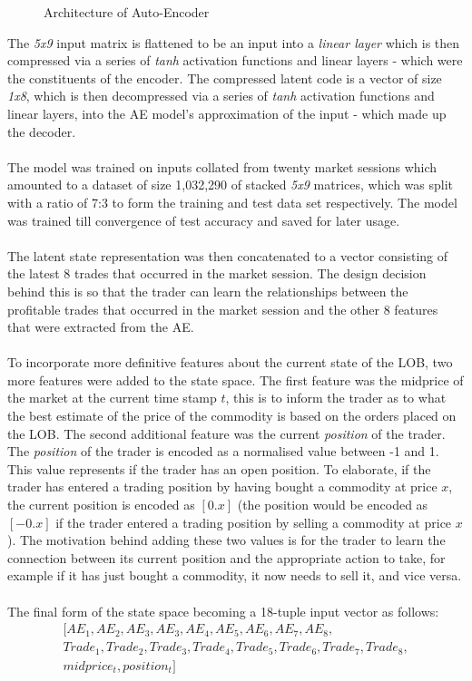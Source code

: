 \documentclass[ %
                    author={Ashwinder Khurana},
                supervisor={Prof Dave Cliff},
                    degree={MEng},
                     title={The Deeply Reinforced Trader},
                  subtitle={},
                      type={enterprise},
                      year={2020} ]{dissertation}
\begin{document}
{\begin{figure}[H]
{  \caption{Architecture of Auto-Encoder}
  }
\label{fig:AE-arch}  
\end{figure}
\noindent 
The \textit{5x9} input matrix is flattened to be an input into a \textit{linear layer} which is then compressed via a series of \textit{tanh} activation functions and linear layers - which were the constituents of the encoder. The compressed latent code is a vector of size \textit{1x8}, which is then decompressed via a series of \textit{tanh} activation functions and linear layers, into the AE model's approximation of the input - which made up the decoder. 
\\
\\
The model was trained on inputs collated from twenty market sessions which amounted to a dataset of size 1,032,290 of stacked \textit{5x9} matrices, which was split with a ratio of 7:3 to form the training and test data set respectively. The model was trained till convergence of test accuracy and saved for later usage. {\color{red}{specify accuracy + talk about how the error is minimised between the input and output of decoder}} 
\\
\\
The latent state representation was then concatenated to a vector consisting of the latest 8 trades that occurred in the market session. The design decision behind this is so that the trader can learn the relationships between the profitable trades that occurred in the market session and the other 8 features that were extracted from the AE. 
\\
\\
To incorporate more definitive features about the current state of the LOB, two more features were added to the state space. The first feature was the midprice of the market at the current time stamp $t$, this is to inform the trader as to what the best estimate of the price of the commodity is based on the orders placed on the LOB. The second additional feature was the current \textit{position} of the trader. The \textit{position} of the trader is encoded as a normalised value between -1 and 1. This value represents if the trader has an open position. To elaborate, if the trader has entered a trading position by having bought a commodity at price $x$, the current position is encoded as $[0.x]$ (the position would be encoded as $[-0.x]$ if the trader entered a trading position by selling a commodity at price $x$). The motivation behind adding these two values is for the trader to learn the connection between its current position and the appropriate action to take, for example if it has just bought a commodity, it now needs to sell it, and vice versa. 
\\
\\
The final form of the state space becoming a 18-tuple input vector as follows:
\begin{equation}
\label{Final state}
\begin{split}
[AE_1,AE_2,AE_3,AE_3,AE_4,AE_5, AE_6, AE_7, AE_8, \\Trade_1,Trade_2, Trade_3, Trade_4, Trade_5, Trade_6, Trade_7, Trade_8,\\ midprice_t, position_t]  
\end{split}
\end{equation}

}
\end{document}
